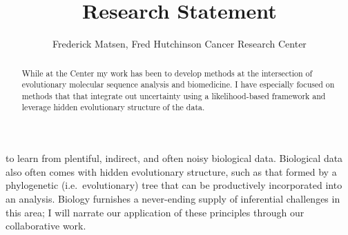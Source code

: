 \documentclass[hyper]{tufte-handout}
\title{Research Statement}
\author{Frederick Matsen, Fred Hutchinson Cancer Research Center} %
\begin{document}
\maketitle

\begin{abstract}
\noindent
While at the Center my work has been to develop methods at the intersection of evolutionary molecular sequence analysis and biomedicine.
I have especially focused on methods that that integrate out uncertainty using a likelihood-based framework and leverage hidden evolutionary structure of the data.
\end{abstract}


 to learn from plentiful, indirect, and often noisy biological data.
Biological data also often comes with hidden evolutionary structure, such as that formed by a phylogenetic (i.e.\ evolutionary) tree that can be productively incorporated into an analysis.
Biology furnishes a never-ending supply of inferential challenges in this area; I will narrate our application of these principles through our collaborative work.
\end{document}
